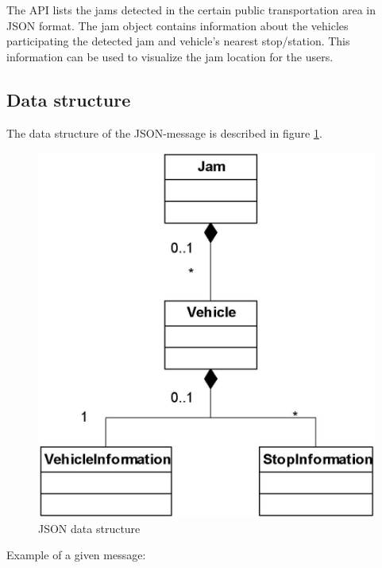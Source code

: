 The API lists the jams detected in the certain public transportation
area in JSON format. The jam object contains information about the
vehicles participating the detected jam and vehicle’s nearest
stop/station. This information can be used to visualize the jam
location for the users.

\subsection*{Data structure}

The data structure of the JSON-message is described in figure \ref{fig:tjd_datastructure}.

\begin{figure}[htbp]
\centering
\includegraphics[width=0.5 \textwidth]{img/tjd/data_structure.jpg}
\caption{JSON data structure}\label{fig:tjd_datastructure}
\end{figure}

Example of a given message:

